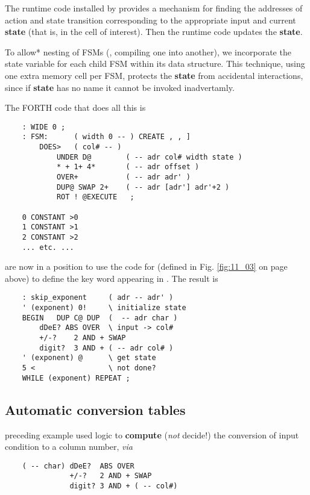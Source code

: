 The runtime code installed by  provides a mechanism for finding the addresses of action and state transition corresponding to the appropriate input and current \textbf{state} (that is, in the cell of interest). Then the runtime code updates the \textbf{state}.

To allow* nesting of FSMs (\ie, compiling one into another), we incorporate the state variable for each child FSM within its data structure. This technique, using one extra memory cell per FSM, protects the \textbf{state} from accidental interactions, since if \textbf{state} has no name it cannot be invoked inadvertamly.

The FORTH code that does all this is
\begin{lstlisting}
    : WIDE 0 ;
    : FSM:      ( width 0 -- ) CREATE , , ]
        DOES>   ( col# -- )
            UNDER D@        ( -- adr col# width state )
            * + 1+ 4*       ( -- adr offset )
            OVER+           ( -- adr adr' )
            DUP@ SWAP 2+    ( -- adr [adr'] adr'+2 )
            ROT ! @EXECUTE   ;

    0 CONSTANT >0
    1 CONSTANT >1
    2 CONSTANT >2
    ... etc. ...
\end{lstlisting}

 are now in a position to use the code for  (defined in Fig. \ref{fig:11_03} on page \pageref{fig:11_03} above) to define the key word  appearing in . The result is

\begin{lstlisting}
    : skip_exponent     ( adr -- adr' )
    ' (exponent) 0!     \ initialize state
    BEGIN   DUP C@ DUP  (  -- adr char )
        dDeE? ABS OVER  \ input -> col#
        +/-?    2 AND + SWAP
        digit?  3 AND + ( -- adr col# )
    ' (exponent) @      \ get state
    5 <                 \ not done?
    WHILE (exponent) REPEAT ;
\end{lstlisting}

\subsection{Automatic conversion tables}
 preceding example used logic to \textbf{compute} (\textit{not} decide!) the conversion of input condition to a column number, \textit{via}

\begin{lstlisting}
    ( -- char) dDeE?  ABS OVER
               +/-?   2 AND + SWAP
               digit? 3 AND + ( -- col#)
\end{lstlisting}

